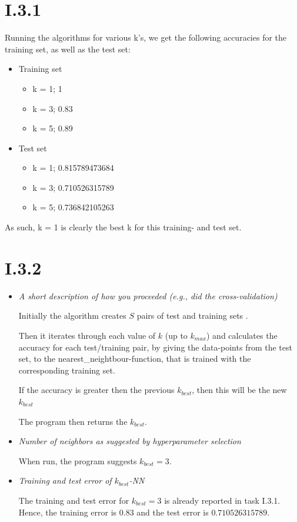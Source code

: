 \documentclass[12pt, a4paper]{article}
\begin{document}
\section{I.3.1}

Running the algorithms for various k's, we get the following accuracies for the training set, as well as the test set:

\begin{itemize}
	\item Training set
	\begin{itemize}
		\item k = 1; 1
		\item k = 3; 0.83
		\item k = 5; 0.89
	\end{itemize}

	\item Test set
	\begin{itemize}
		\item k = 1; 0.815789473684
		\item k = 3; 0.710526315789
		\item k = 5; 0.736842105263
	\end{itemize}
\end{itemize}

As such, k = 1 is clearly the best k for this training- and test set.

\section{I.3.2}
\begin{itemize}
\item \textit{A short description of how you proceeded (e.g., did the
cross-validation)}

Initially the algorithm creates $S$ pairs of test and training sets .

Then it iterates through each value of $k$ (up to $k_{max}$) and calculates the accuracy for each test/training pair, by giving the data-points from the test set, to the nearest\_neightbour-function, that is trained with the corresponding training set.

If the accuracy is greater then the previous $k_{best}$, then this will be the new $k_{best}$

The program then returns the $k_{best}$.

\item \textit{Number of neighbors as suggested by hyperparameter selection}

When run, the program suggests $k_{best} = 3$.

\item \textit{Training and test error of $k_{best}$-NN}

The training and test error for $k_{best} = 3$ is already reported in task I.3.1. Hence, the training error is $0.83$ and the test error is $0.710526315789$.

\end{itemize}
\end{document}
